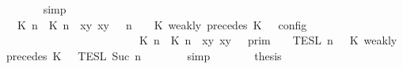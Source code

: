 \begin{isabellebody}
\ \ \ \ \ \ \isamarkupfalse%
\ simp\isanewline
\ \ \ \ \isamarkupfalse%
\ \isamarkupfalse%
\ {\isacartoucheopen}{\isasymlbrakk}\ {\isacharparenleft}{\isacharparenleft}{\isasymlceil}{\isacharhash}\isactrlsup {\isasymle}\ K\ n{\isacharcomma}\ {\isacharhash}\isactrlsup {\isasymle}\ K\ n{\isasymrceil}\ {\isasymin}\ {\isacharparenleft}{\isasymlambda}{\isacharparenleft}x{\isacharcomma}y{\isacharparenright}{\isachardot}\ x{\isasymle}y{\isacharparenright}{\isacharparenright}\ {\isacharhash}\ {\isasymGamma}{\isacharparenright}{\isacharcomma}\ n\ {\isasymturnstile}\ {\isasymPsi}\ {\isasymtriangleright}\ {\isacharparenleft}{\isacharparenleft}K\ weakly\ precedes\ K\ {\isacharhash}\ {\isasymPhi}{\isacharparenright}\ {\isasymrbrakk}\isactrlsub c\isactrlsub o\isactrlsub n\isactrlsub f\isactrlsub i\isactrlsub g\isanewline
\ \ \ \ \ \ \ \ \ \ \ \ \ \ \ \ \ \ \ \ \ \ {\isacharequal}\ {\isasymlbrakk}{\isasymlbrakk}\ {\isacharparenleft}{\isasymlceil}{\isacharhash}\isactrlsup {\isasymle}\ K\ n{\isacharcomma}\ {\isacharhash}\isactrlsup {\isasymle}\ K\ n{\isasymrceil}\ {\isasymin}\ {\isacharparenleft}{\isasymlambda}{\isacharparenleft}x{\isacharcomma}y{\isacharparenright}{\isachardot}\ x{\isasymle}y{\isacharparenright}{\isacharparenright}\ {\isacharhash}\ {\isasymGamma}\ {\isasymrbrakk}{\isasymrbrakk}\isactrlsub p\isactrlsub r\isactrlsub i\isactrlsub m\ {\isasyminter}\ {\isasymlbrakk}{\isasymlbrakk}\ {\isasymPsi}\ {\isasymrbrakk}{\isasymrbrakk}\isactrlsub T\isactrlsub E\isactrlsub S\isactrlsub L\isactrlbsup {\isasymge}\ n\isactrlesup \ {\isasyminter}\ {\isasymlbrakk}{\isasymlbrakk}\ {\isacharparenleft}K\ weakly\ precedes\ K\ {\isacharhash}\ {\isasymPhi}\ {\isasymrbrakk}{\isasymrbrakk}\isactrlsub T\isactrlsub E\isactrlsub S\isactrlsub L\isactrlbsup {\isasymge}\ Suc\ n\isactrlesup {\isacartoucheclose}\isanewline
\ \ \ \ \ \ \isamarkupfalse%
\ simp\isanewline
\ \ \ \ \isamarkupfalse%
\ \isamarkupfalse%
\ {\isacharquery}thesis\isanewline
\ \ \ \ \isamarkupfalse%
\ {\isacharminus}\isanewline
\ \ \ \ \ \ \isamarkupfalse%

\end{isabellebody}
